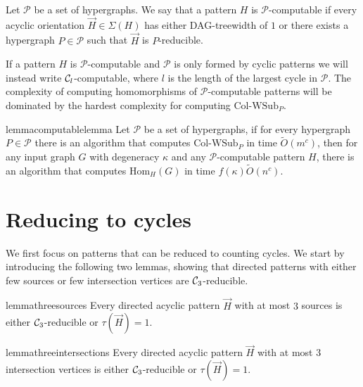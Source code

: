 \documentclass[a4paper,UKenglish,cleveref, autoref, numberwithinsect, thm-restate]{lipics-v2021}
\newcommand{\reducible}[1]{${#1}$-reducible}
\newcommand{\computable}[1]{${#1}$-computable}
\newcommand{\cycle}[1]{\cC_{#1}}
\newcommand{\WSubNI}[1]{\mathrm{\text{Col-WSub}}_{#1}}
\newcommand{\Hom}[2]{\mathrm{Hom}_{#2}(#1)}
\newcommand{\degen}{\kappa}
\newcommand{\dtw}{\tau}
\newcommand{\dagtreewidth}{DAG-treewidth}
\newcommand{\cC}{{\cal C}}
\begin{document}
	\begin{definition}[\computable{\mathcal{P}}] \label{def:computable}
		Let $\mathcal{P}$ be a set of hypergraphs. We say that a pattern $H$ is \computable{\mathcal{P}} if every acyclic orientation $\vec{H} \in \Sigma(H)$ has either \dagtreewidth{} of $1$ or there exists a hypergraph $P \in \mathcal{P}$ such that $\vec{H}$ is $P$-reducible.
	\end{definition}
	
		If a pattern $H$ is \computable{\mathcal{P}} and $\mathcal{P}$ is only formed by cyclic patterns we will instead write \computable{\cycle{l}}, where $l$ is the length of the largest cycle in $\mathcal{P}$. The complexity of computing homomorphisms of \computable{\mathcal{P}} patterns will be dominated by the hardest complexity for computing $\WSubNI{P}$.
	
	\begin{restatable}{lemma}{computablelemma} \label{lem:computable}
				Let $\mathcal{P}$ be a set of hypergraphs, if for every hypergraph $P \in \mathcal{P}$ there is an algorithm that computes $\WSubNI{P}$ in time $\tilde{O}(m^c)$, then for any input graph $G$ with degeneracy $\degen$ and any \computable{\mathcal{P}} pattern $H$, there is an algorithm that computes $\Hom{G}{H}$ in time $f(\degen)\tilde{O}(n^c)$.
		\end{restatable}


	\section{Reducing to cycles} \label{sec:reductions}
	
	We first focus on patterns that can be reduced to counting cycles. We start by introducing the following two lemmas, showing that directed patterns with either few sources or few intersection vertices are \reducible{\cycle{3}}.
	
	\begin{restatable}{lemma}{threesources} \label{lem:3sources}
		Every directed acyclic pattern $\vec{H}$ with at most $3$ sources is either \reducible{\cycle{3}} or $\dtw(\vec{H})=1$.
	\end{restatable}

	\begin{restatable}{lemma}{threeintersections} \label{lem:3intersections}
		Every directed acyclic pattern $\vec{H}$ with at most $3$ intersection vertices is either \reducible{\cycle{3}} or $\dtw(\vec{H})=1$. 
	\end{restatable}
	
\end{document}
